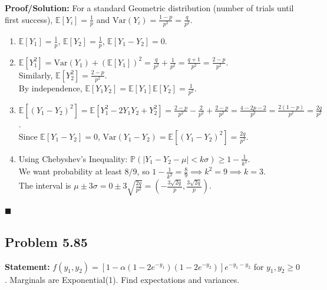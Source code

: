 \documentclass[11pt, a4paper]{article}
\theoremstyle{definition}
\theoremstyle{remark}
\newcommand{\E}{\mathbb{E}}
\newcommand{\Prob}{\mathbb{P}}
\newcommand{\Var}{\mathrm{Var}}
\begin{document}
\textbf{Proof/Solution:}
For a standard Geometric distribution (number of trials until first success), $\E[Y_i] = \frac{1}{p}$ and $\Var(Y_i) = \frac{1-p}{p^2} = \frac{q}{p^2}$.
\begin{enumerate}[label=\alph*)]
    \item $\E[Y_1] = \frac{1}{p}$, $\E[Y_2] = \frac{1}{p}$, $\E[Y_1 - Y_2] = 0$.
    \item $\E[Y_1^2] = \Var(Y_1) + (\E[Y_1])^2 = \frac{q}{p^2} + \frac{1}{p^2} = \frac{q+1}{p^2} = \frac{2-p}{p^2}$. \\ \relax
    Similarly, $\E[Y_2^2] = \frac{2-p}{p^2}$. \\ \relax
    By independence, $\E[Y_1 Y_2] = \E[Y_1]\E[Y_2] = \frac{1}{p^2}$.
    \item $\E[(Y_1 - Y_2)^2] = \E[Y_1^2 - 2Y_1 Y_2 + Y_2^2] = \frac{2-p}{p^2} - \frac{2}{p^2} + \frac{2-p}{p^2} = \frac{4 - 2p - 2}{p^2} = \frac{2(1-p)}{p^2} = \frac{2q}{p^2}$. \\ \relax
    Since $\E[Y_1 - Y_2] = 0$, $\Var(Y_1 - Y_2) = \E[(Y_1 - Y_2)^2] = \frac{2q}{p^2}$.
    \item Using Chebyshev's Inequality: $\Prob(|Y_1 - Y_2 - \mu| < k\sigma) \geq 1 - \frac{1}{k^2}$. \\ \relax
    We want probability at least $8/9$, so $1 - \frac{1}{k^2} = \frac{8}{9} \implies k^2 = 9 \implies k = 3$. \\ \relax
    The interval is $\mu \pm 3\sigma = 0 \pm 3\sqrt{\frac{2q}{p^2}} = \left( -\frac{3\sqrt{2q}}{p}, \frac{3\sqrt{2q}}{p} \right)$.
\end{enumerate}
\hfill $\blacksquare$

\subsection{Problem 5.85}
\textbf{Statement:} $f(y_1, y_2) = [1 - \alpha(1 - 2e^{-y_1})(1 - 2e^{-y_2})]e^{-y_1-y_2}$ for $y_1, y_2 \geq 0$. Marginals are Exponential(1). Find expectations and variances.
\end{document}
